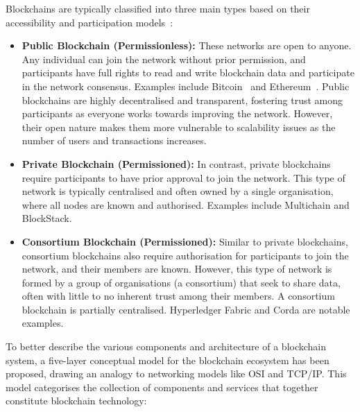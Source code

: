 \vspace{12pt}

Blockchains are typically classified into three main types based on their accessibility and participation models~\cite{sanka2021systematic}:

\begin{itemize}
    \item \textbf{Public Blockchain (Permissionless):} These networks are open to anyone. Any individual can join the network without prior permission, and participants have full rights to read and write blockchain data and participate in the network consensus. Examples include Bitcoin~\cite{nakamoto2008bitcoin} and Ethereum~\cite{buterin2014ethereum}. Public blockchains are highly decentralised and transparent, fostering trust among participants as everyone works towards improving the network. However, their open nature makes them more vulnerable to scalability issues as the number of users and transactions increases.

    \item \textbf{Private Blockchain (Permissioned):} In contrast, private blockchains require participants to have prior approval to join the network. This type of network is typically centralised and often owned by a single organisation, where all nodes are known and authorised. Examples include Multichain and BlockStack.

    \item \textbf{Consortium Blockchain (Permissioned):} Similar to private blockchains, consortium blockchains also require authorisation for participants to join the network, and their members are known. However, this type of network is formed by a group of organisations (a consortium) that seek to share data, often with little to no inherent trust among their members. A consortium blockchain is partially centralised. Hyperledger Fabric and Corda are notable examples.
\end{itemize}

\vspace{12pt}
\vspace{12pt}

To better describe the various components and architecture of a blockchain system, a five-layer conceptual model for the blockchain ecosystem has been proposed, drawing an analogy to networking models like OSI and TCP/IP. This model categorises the collection of components and services that together constitute blockchain technology:

